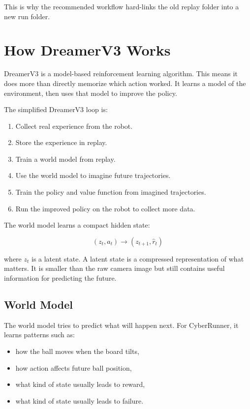 \documentclass[11pt]{article}
\begin{document}
This is why the recommended workflow hard-links the old replay folder into a new run folder.

\section{How DreamerV3 Works}

DreamerV3 is a model-based reinforcement learning algorithm. This means it does more than directly memorize which action worked. It learns a model of the environment, then uses that model to improve the policy.

The simplified DreamerV3 loop is:

\begin{enumerate}[leftmargin=*]
  \item Collect real experience from the robot.
  \item Store the experience in replay.
  \item Train a world model from replay.
  \item Use the world model to imagine future trajectories.
  \item Train the policy and value function from imagined trajectories.
  \item Run the improved policy on the robot to collect more data.
\end{enumerate}

The world model learns a compact hidden state:

\begin{equation}
(z_t, a_t) \rightarrow (z_{t+1}, \hat{r}_t)
\end{equation}

where $z_t$ is a latent state. A latent state is a compressed representation of what matters. It is smaller than the raw camera image but still contains useful information for predicting the future.

\subsection{World Model}

The world model tries to predict what will happen next. For CyberRunner, it learns patterns such as:

\begin{itemize}[leftmargin=*]
  \item how the ball moves when the board tilts,
  \item how action affects future ball position,
  \item what kind of state usually leads to reward,
  \item what kind of state usually leads to failure.
\end{itemize}
\end{document}
